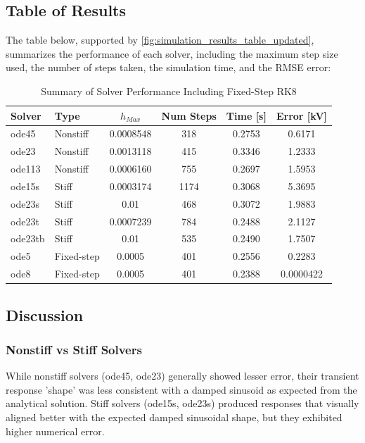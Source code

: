 \subsection*{Table of Results}
The table below, supported by \cref{fig:simulation_results_table_updated}, summarizes the performance of each solver, including the maximum step size used, the number of steps taken, the simulation time, and the RMSE error:

\begin{table}[h!]
    \centering
    \begin{tabular}{|l|l|c|c|c|c|}
        \hline
        \textbf{Solver} & \textbf{Type} & \textbf{$h_{Max}$} & \textbf{Num Steps} & \textbf{Time [s]} & \textbf{Error [kV]} \\
        \hline
        ode45 & Nonstiff & 0.0008548 & 318 & 0.2753 & 0.6171 \\
        ode23 & Nonstiff & 0.0013118 & 415 & 0.3346 & 1.2333 \\
        ode113 & Nonstiff & 0.0006160 & 755 & 0.2697 & 1.5953 \\
        ode15s & Stiff & 0.0003174 & 1174 & 0.3068 & 5.3695 \\
        ode23s & Stiff & 0.01 & 468 & 0.3072 & 1.9883 \\
        ode23t & Stiff & 0.0007239 & 784 & 0.2488 & 2.1127 \\
        ode23tb & Stiff & 0.01 & 535 & 0.2490 & 1.7507 \\
        ode5 & Fixed-step & 0.0005 & 401 & 0.2556 & 0.2283 \\
        ode8 & Fixed-step & 0.0005 & 401 & 0.2388 & 0.0000422 \\
        \hline
    \end{tabular}
    \caption{Summary of Solver Performance Including Fixed-Step RK8}
    \label{tab:solver_performance_updated}
\end{table}

\subsection*{Discussion}
\subsubsection*{Nonstiff vs Stiff Solvers}
While nonstiff solvers (ode45, ode23) generally showed lesser error, their transient response 'shape' was less consistent with a damped sinusoid as expected from the analytical solution. Stiff solvers (ode15s, ode23s) produced responses that visually aligned better with the expected damped sinusoidal shape, but they exhibited higher numerical error.

